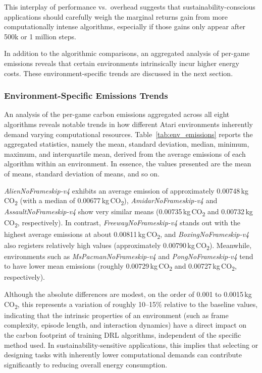 This interplay of performance vs.\ overhead suggests that sustainability-conscious 
applications should carefully weigh the marginal returns gain from more computationally 
intense algorithms, especially if those gains only appear after 500k or 1 million steps.

In addition to the algorithmic comparisons, an aggregated analysis of per-game emissions reveals that certain environments intrinsically incur higher energy costs. These environment-specific trends are discussed in the next section.

\subsubsection{Environment-Specific Emissions Trends}
\label{subsubsec:environment_emissions}
An analysis of the per-game carbon emissions aggregated across all eight algorithms reveals notable trends in how different Atari environments inherently demand varying computational resources. Table~\ref{tab:env_emissions} reports the aggregated statistics, namely the mean, standard deviation, median, minimum, maximum, and interquartile mean, derived from the average emissions of each algorithm within an environment. In essence, the values presented are the mean of means, standard deviation of means, and so on.

\emph{AlienNoFrameskip-v4} exhibits an average emission of approximately \num{0.00748}\,kg\,CO\textsubscript{2} (with a median of \num{0.00677}\,kg\,CO\textsubscript{2}), \emph{AmidarNoFrameskip-v4} and \emph{AssaultNoFrameskip-v4} show very similar means (\num{0.00735}\,kg\,CO\textsubscript{2} and \num{0.00732}\,kg\,CO\textsubscript{2}, respectively). In contrast, \emph{FreewayNoFrameskip-v4} stands out with the highest average emissions at about \num{0.00811}\,kg\,CO\textsubscript{2}, and \emph{BoxingNoFrameskip-v4} also registers relatively high values (approximately \num{0.00790}\,kg\,CO\textsubscript{2}). Meanwhile, environments such as \emph{MsPacmanNoFrameskip-v4} and \emph{PongNoFrameskip-v4} tend to have lower mean emissions (roughly \num{0.00729}\,kg\,CO\textsubscript{2} and \num{0.00727}\,kg\,CO\textsubscript{2}, respectively).

Although the absolute differences are modest, on the order of \num{0.001} to \num{0.0015}\,kg\,CO\textsubscript{2}, this represents a variation of roughly \num{10}–\num{15}\% relative to the baseline values, indicating that the intrinsic properties of an environment (such as frame complexity, episode length, and interaction dynamics) have a direct impact on the carbon footprint of training DRL algorithms, independent of the specific method used. In sustainability-sensitive applications, this implies that selecting or designing tasks with inherently lower computational demands can contribute significantly to reducing overall energy consumption.

